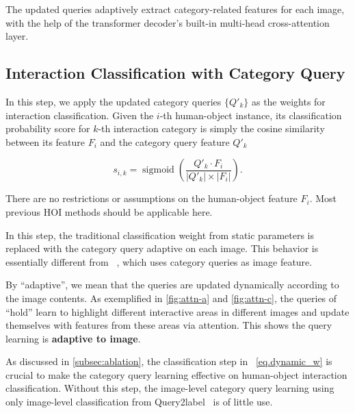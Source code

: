 \documentclass[10pt,twocolumn,letterpaper]{article}
\begin{document}
The updated queries adaptively extract category-related features for each image, with the help of the transformer decoder's built-in multi-head cross-attention layer.

\subsection{Interaction Classification with Category Query}
\label{sec:interaction_classification_with_category_query}

In this step, we apply the updated category queries $\{Q'_k\}$ as the weights for interaction classification. Given the $i$-th human-object instance, its classification probability score for $k$-th interaction category is simply the cosine similarity between its feature $F_{i}$ and the category query feature $Q'_{k}$

\begin{equation}
   s_{i,k} = \operatorname{sigmoid}(\frac{Q'_{k} \cdot F_{i}}{|Q'_{k}| \times |F_{i}|}).
   \label{eq.dynamic_w}
\end{equation}

There are no restrictions or assumptions on the human-object feature $F_{i}$. Most previous HOI methods should be applicable here.

In this step, the traditional classification weight from static parameters is replaced with the category query adaptive on each image. This behavior is essentially different from ~\cite{liu2021query2label}, which uses category queries as image feature.

By ``adaptive'', we mean that the queries are updated dynamically according to the image contents.
As exemplified in \cref{fig:attn-a} and \cref{fig:attn-c}, the queries of ``hold'' learn to highlight different interactive areas in different images and update themselves with features from these areas via attention. This shows the query learning is \textbf{adaptive to image}.

As discussed in \cref{subsec:ablation}, the classification step in ~\cref{eq.dynamic_w} is crucial to make the category query learning effective on human-object interaction classification. Without this step, the image-level category query learning using only image-level classification from Query2label~\cite{liu2021query2label} is of little use.
\end{document}
